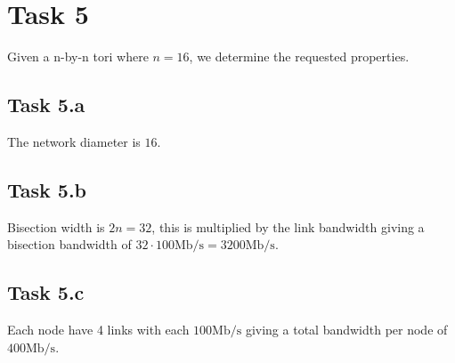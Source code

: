 \section{Task 5}
Given a n-by-n tori where $n=16$, we determine the requested properties.

\subsection{Task 5.a}
The network diameter is $16$.


\subsection{Task 5.b}
Bisection width is $2n = 32$, this is multiplied by the link bandwidth giving a
bisection bandwidth of $32 \cdot 100\text{Mb/s} = 3200\text{Mb/s}$.

\subsection{Task 5.c}
Each node have 4 links with each $100\text{Mb/s}$ giving a total bandwidth per
node of $400\text{Mb/s}$.
